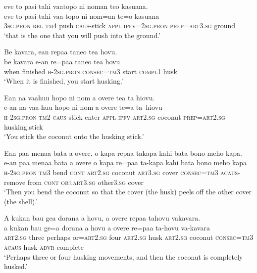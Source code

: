 \ea\label{ex:text01-58}
eve to pasi tahi vaatopo ni noman teo kasuana.\\
\gll eve	to	pasi	tahi	vaa-topo	ni	nom=an	te=o	kasuana\\
     3\textsc{sg}.\textsc{pron}	\textsc{rel}	\textsc{tm}4	push	\textsc{caus}-stick	\textsc{appl}	\textsc{ipfv}=2\textsc{sg}.\textsc{pron}	\textsc{prep}=\textsc{art}3.\textsc{sg}	ground\\
\glt `that is the one that you will push into the ground.'
\z

\ea\label{ex:text01-59}
Be kavara, ean repaa taneo tea hovu.\\
\gll be	kavara	e-an	re=paa	taneo	tea	hovu\\
     when	finished	\textsc{h}-2\textsc{sg}.\textsc{pron}	\textsc{consec}=\textsc{tm}3	start	\textsc{compl}1	husk\\
\glt `When it is finished, you start husking.'
\z

\ea\label{ex:text01-60}
Ean na vaahuu hopo ni nom a overe tea ta hiovu.\\
\gll e-an	na	vaa-huu	hopo	ni	nom	a	overe	te=a	ta~hiovu\\
     \textsc{h}-2\textsc{sg}.\textsc{pron}	\textsc{tm}2	\textsc{caus}-stick	enter	\textsc{appl}	\textsc{ipfv}	\textsc{art}2.\textsc{sg}	coconut	\textsc{prep}=\textsc{art}2.\textsc{sg}	husking.stick\\
\glt `You stick the coconut onto the husking stick.'
\z

\ea\label{ex:text01-61}
Ean paa menaa bata a overe, o kapa repaa takapa kahi bata bono meho kapa.\\
\gll e-an	paa	menaa	bata	a	overe	o	kapa	re=paa	ta-kapa	kahi	bata	bono	meho	kapa\\
     \textsc{h}-2\textsc{sg}.\textsc{pron}	\textsc{tm}3	bend	\textsc{cont}	\textsc{art}2.\textsc{sg}	coconut	\textsc{art}3.\textsc{sg}	cover	\textsc{consec}=\textsc{tm}3	\textsc{acaus}-remove	from	\textsc{cont}	\textsc{obj}.\textsc{art}3.\textsc{sg}	other3.\textsc{sg}	cover\\
\glt `Then you bend the coconut so that the cover (the husk) peels off the other cover (the shell).'
\z

\ea\label{ex:text01-62}
A kukan bau gea dorana a hovu, a overe repaa tahovu vakavara.\\
\gll a	kukan	bau	ge=a	dorana	a	hovu	a	overe	re=paa	ta-hovu	va-kavara\\
     \textsc{art}2.\textsc{sg}	three	perhaps	or=\textsc{art}2.\textsc{sg}	four	\textsc{art}2.\textsc{sg}	husk	\textsc{art}2.\textsc{sg}	coconut	\textsc{consec}=\textsc{tm}3	\textsc{acaus}-husk	\textsc{advr}-complete\\
\glt `Perhaps three or four husking movements, and then the coconut is completely husked.'
\z

